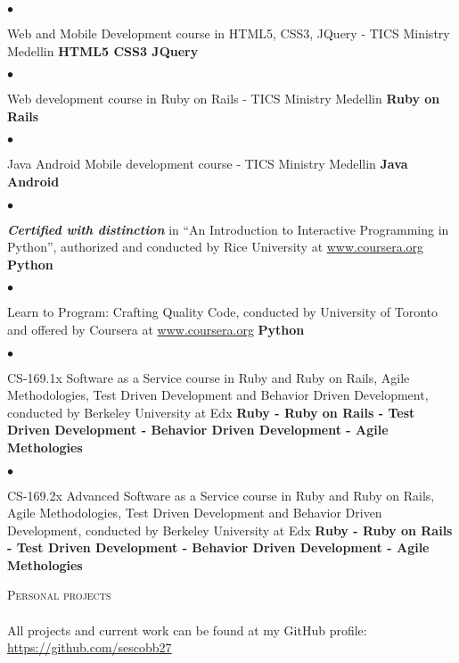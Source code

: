 \documentclass[a4paper]{article}
\newcommand{\lineunder}{\vspace*{-8pt} \\ \hspace*{-18pt} \hrulefill \\}
\newcommand{\header}[1]{{\hspace*{-15pt}\vspace*{6pt}
\textsc{#1}} \vspace*{-6pt} \lineunder}
\newenvironment{achievements}{\begin{list}{$\bullet$}{\topsep 0pt \itemsep
-2pt}}{\vspace*{4pt}\end{list}}
\newcommand{\programming}[1]{{\textbf{#1}}}
\newcommand{\emphasys}[1]{\textbf{\emph{#1}}}
\begin{document}
\begin{achievements}
\item Web and Mobile Development course in HTML5, CSS3, JQuery - TICS Ministry Medellin
\programming{ HTML5 CSS3 JQuery }
\end{achievements}
\begin{achievements}
\item{Web development course in Ruby on Rails - TICS Ministry Medellin}
\programming{Ruby on Rails}
\end{achievements}
\begin{achievements}
\item{Java Android Mobile development course - TICS Ministry Medellin}
\programming{Java Android}
\end{achievements}
\begin{achievements}
\item{\emphasys{Certified with distinction} in “An Introduction to Interactive Programming in Python”, authorized and conducted by Rice University at \url{www.coursera.org}}
\programming{Python}
\end{achievements}
\begin{achievements}
\item{Learn to Program: Crafting Quality Code, conducted by University of Toronto and offered by Coursera at \url{www.coursera.org}}
\programming{Python}
\end{achievements}
\begin{achievements}
\item{CS-169.1x Software as a Service course in Ruby and Ruby on Rails, Agile Methodologies, Test Driven Development and Behavior Driven Development, conducted by Berkeley University at Edx}
\programming{Ruby - Ruby on Rails - Test Driven Development - Behavior Driven Development - Agile Methologies}
\end{achievements}
\begin{achievements}
\item{CS-169.2x Advanced Software as a Service course in Ruby and Ruby on Rails, Agile Methodologies, Test Driven Development and Behavior Driven Development, conducted by Berkeley University at Edx}
\programming{Ruby - Ruby on Rails - Test Driven Development - Behavior Driven Development - Agile Methologies}
\end{achievements}
\header{Personal projects}
All projects and current work can be found at my GitHub profile: \url{https://github.com/sescobb27}
\end{document}
